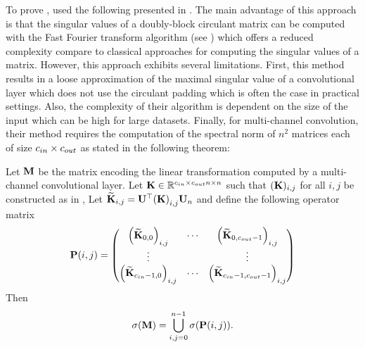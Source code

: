 \noindent
To prove , \citet{sedghi2018singular} used the following  presented in .
The main advantage of this approach is that the singular values of a doubly-block circulant matrix can be computed with the Fast Fourier transform algorithm (see ) which offers a reduced complexity compare to classical approaches for computing the singular values of a matrix. 
However, this approach exhibits several limitations.
First, this method results in a loose approximation of the maximal singular value of a convolutional layer which does not use the circulant padding which is often the case in practical settings.
Also, the complexity of their algorithm is dependent on the size of the input which can be high for large datasets.
Finally, for multi-channel convolution, their method requires the computation of the spectral norm of $n^2$ matrices each of size $c_{in} \times c_{out}$ as stated in the following theorem:

\begin{theorem} 
  Let $\mathbf{M}$ be the matrix encoding the linear transformation computed by a multi-channel convolutional layer.
  Let $\mathbf{K} \in \mathbb{R}^{c_{in} \times c_{out} n \times n}$ such that $(\mathbf{K})_{i,j}$ for all $i,j$ be constructed as in , 
  Let $\widetilde{\Kmat}_{i,j} = \Umat^\top \leftmat \Kmat \rightmat_{i,j} \Umat_n $ and define the following operator matrix 
  \begin{equation}
    \Pmat(i,j) = \leftmatrix 
    \leftmat \widetilde{\Kmat}_{0,0} \rightmat_{i, j} & \cdots & \leftmat \widetilde{\Kmat}_{0, \cout-1} \rightmat_{i, j} \\
    \vdots & & \vdots \\
    \leftmat \widetilde{\Kmat}_{\cin-1, 0} \rightmat_{i, j} & \cdots & \leftmat \widetilde{\Kmat}_{\cin-1, \cout-1} \rightmat_{i, j}
    \rightmatrix
  \end{equation}
  Then
  \begin{equation}
    \sigma(\Mmat) = \bigcup_{i, j = 0}^{n-1} \sigma \left(  \Pmat(i,j) \right).
  \end{equation}
\end{theorem}





